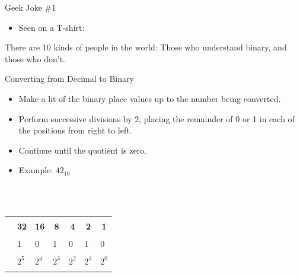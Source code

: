 \documentclass[graphics]{beamer}
\newcommand\redout{\bgroup\markoverwith
{\textcolor{red}{\rule[0.5ex]{2pt}{0.8pt}}}\ULon}
\newcommand*{\thead}[1]{\multicolumn{1}{c}{\bfseries #1}}
\begin{document}
\begin{frame}{Geek Joke \#1}
    \begin{itemize}
        \item Seen on a T-shirt:
    \end{itemize}
    There are 10 kinds of people in the world: Those who understand binary, and those who don't.
\end{frame}

\begin{frame}{Converting from Decimal to Binary}
    \begin{itemize}
        \item Make a lit of the binary place values up to the number being converted.
        \item Perform successive divisions by 2, placing the remainder of 0 or 1 in each of the positions from right to left.
        \item Continue until the quotient is zero.
        \item Example: $42_{10}$
    \end{itemize}
    \\ ~~ \\
    \centering
    \begin{tabular}{c l l l l l l}
        \redout{\thead{64}} & \thead{32} & \thead{16} & \thead{8} & \thead{4} & \thead{2} & \thead{1} \\
        & 1 & 0 & 1 & 0 & 1 & 0 \\
        \redout{$2^6$} & $2^5$ & $2^4$ & $2^3$ & $2^2$ & $2^1$ & $2^0$
    \end{tabular}
\end{frame}
\end{document}

